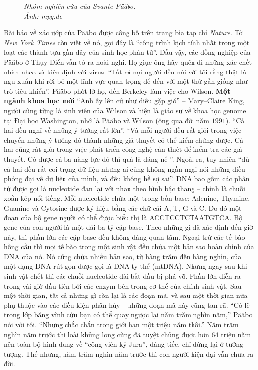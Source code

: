 \begin{multicols}{2}
\begin{figure}[H]
		\caption{\small\textit{\color{timhieukhoahoc}Nhóm nghiên cứu của Svante Pääbo. \\Ảnh: mpg.de}}
		\vspace*{-10pt}
	\end{figure}
	Bài báo về xác ướp của Pääbo được công bố trên trang bìa tạp chí \textit{Nature}. Tờ \textit{New York Times} còn viết về nó, gọi đây là “công trình kịch tính nhất trong một loạt các thành tựu gần đây của sinh học phân tử”. Dẫu vậy, các đồng nghiệp của Pääbo ở Thụy Điển vẫn tỏ ra hoài nghi. Họ giục ông hãy quên đi những xác chết nhăn nheo và kiên định với virus. “Tất cả nọi người đều nói với tôi rằng thật là ngu xuẩn khi rời bỏ một lĩnh vực quan trọng để đến với một thứ gần giống như trò tiêu khiển”. Pääbo phớt lờ họ, đến Berkeley làm việc cho Wilson.
	\vskip 0.1cm
	\textbf{\color{timhieukhoahoc}Một ngành khoa học mới}
	\vskip 0.1cm
	“Anh ấy lên cứ như diều gặp gió” -- Mary--Claire King, người cũng từng là sinh viên của Wilson và hiện là giáo sư về khoa học genome tại Đại học Washington, nhớ là Pääbo và Wilson (ông qua đời năm $1991$). “Cả hai đều nghĩ về những ý tưởng rất lớn”. “Và mỗi người đều rất giỏi trong việc chuyển những ý tưởng đó thành những giả thuyết có thể kiểm chứng được. Cả hai cũng rất giỏi trong việc phát triển công nghệ cần thiết để kiểm tra các giả thuyết. Có được cả ba năng lực đó thì quả là đáng nể ”. Ngoài ra, tuy nhiên “dù cả hai đều rất coi trọng dữ liệu nhưng ai cũng không ngần ngại nói những điều phóng đại về dữ liệu của mình, và đều không hề sợ sai”.
	\vskip 0.1cm
	DNA bao gồm các phân tử được gọi là nucleotide đan lại với nhau theo hình bậc thang -- chính là chuỗi xoắn kép nổi tiếng. Mỗi nucleotide chứa một trong bốn base: Adenine, Thymine, Guanine và Cytosine được ký hiệu bằng các chữ cái A, T, G và C. Do đó một đoạn của bộ gene người có thể được biểu thị là ACCTCCTCTAATGTCA. Bộ gene của con người là một dải ba tỷ cặp base. Theo những gì đã xác định đến giờ này, thì phần lớn các cặp base đều không đáng quan tâm.
	\vskip 0.1cm
	Ngoại trừ các tế bào hồng cầu thì mọi tế bào trong một sinh vật đều chứa một bản sao hoàn chỉnh của DNA của nó. Nó cũng chứa nhiều bản sao, từ hàng trăm đến hàng nghìn, của một dạng DNA rút gọn được gọi là DNA ty thể (mtDNA). Nhưng ngay sau khi sinh vật chết thì các chuỗi nucleotide dài bắt đầu bị phá vỡ. Phần lớn diễn ra trong vài giờ đầu tiên bởi các enzym bên trong cơ thể của chính sinh vật. Sau một thời gian, tất cả những gì còn lại là các đoạn mã, và sau một thời gian nữa -- phụ thuộc vào các điều kiện phân hủy -- những đoạn mã này cũng tan rã. “Có lẽ trong lớp băng vĩnh cửu bạn có thể quay ngược lại năm trăm nghìn năm,” Pääbo nói với tôi. “Nhưng chắc chắn trong giới hạn một triệu năm thôi.” Năm trăm nghìn năm trước thì loài khủng long cũng đã tuyệt chủng được hơn $64$ triệu năm nên toàn bộ hình dung về “công viên kỷ Jura”, đáng tiếc, chỉ dừng lại ở tưởng tượng. Thế nhưng, năm trăm nghìn năm trước thì con người hiện đại vẫn chưa ra đời.

\end{multicols}
